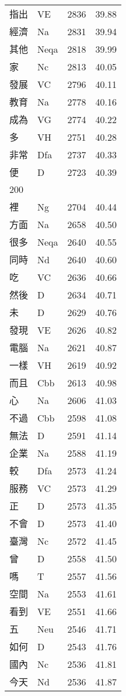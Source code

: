 \documentclass[twocolumn]{book}
\begin{document}
\begin{supertabular}{llrr}
指出 & VE & 2836 &  39.88\\
經濟 & Na & 2831 &  39.94\\
其他 & Neqa & 2818 &  39.99\\
家 & Nc & 2813 &  40.05\\
發展 & VC & 2796 &  40.11\\
教育 & Na & 2778 &  40.16\\
成為 & VG & 2774 &  40.22\\
多 & VH & 2751 &  40.28\\
非常 & Dfa & 2737 &  40.33\\
便 & D & 2723 &  40.39\\
200\\
裡 & Ng & 2704 &  40.44\\
方面 & Na & 2658 &  40.50\\
很多 & Neqa & 2640 &  40.55\\
同時 & Nd & 2640 &  40.60\\
吃 & VC & 2636 &  40.66\\
然後 & D & 2634 &  40.71\\
未 & D & 2629 &  40.76\\
發現 & VE & 2626 &  40.82\\
電腦 & Na & 2621 &  40.87\\
一樣 & VH & 2619 &  40.92\\
而且 & Cbb & 2613 &  40.98\\
心 & Na & 2606 &  41.03\\
不過 & Cbb & 2598 &  41.08\\
無法 & D & 2591 &  41.14\\
企業 & Na & 2588 &  41.19\\
較 & Dfa & 2573 &  41.24\\
服務 & VC & 2573 &  41.29\\
正 & D & 2573 &  41.35\\
不會 & D & 2573 &  41.40\\
臺灣 & Nc & 2572 &  41.45\\
曾 & D & 2558 &  41.50\\
嗎 & T & 2557 &  41.56\\
空間 & Na & 2553 &  41.61\\
看到 & VE & 2551 &  41.66\\
五 & Neu & 2546 &  41.71\\
如何 & D & 2543 &  41.76\\
國內 & Nc & 2536 &  41.81\\
今天 & Nd & 2536 &  41.87\\

\end{supertabular}
\end{document}

